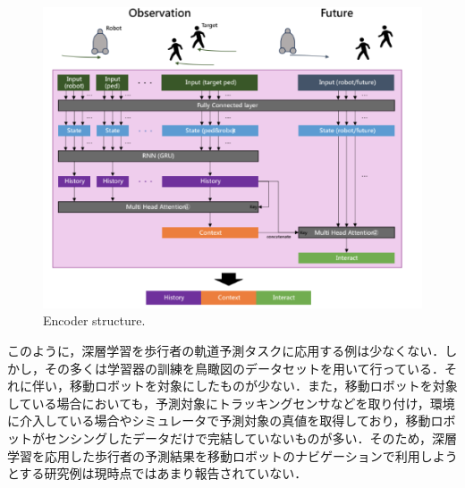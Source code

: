 
\begin{figure}[hbtp]
     \centering
    \includegraphics[keepaspectratio, scale=0.68]
         {images/future-robot.png}
    \caption{Encoder structure.\protect\footnotemark[5]}
    \label{Fig:future-robot}
\end{figure}

\protect{}

このように，深層学習を歩行者の軌道予測タスクに応用する例は少なくない．しかし，その多くは学習器の訓練を鳥瞰図のデータセットを用いて行っている．それに伴い，移動ロボットを対象にしたものが少ない．また，移動ロボットを対象している場合においても，予測対象にトラッキングセンサなどを取り付け，環境に介入している場合やシミュレータで予測対象の真値を取得しており，移動ロボットがセンシングしたデータだけで完結していないものが多い．そのため，深層学習を応用した歩行者の予測結果を移動ロボットのナビゲーションで利用しようとする研究例は現時点ではあまり報告されていない．

\newpage